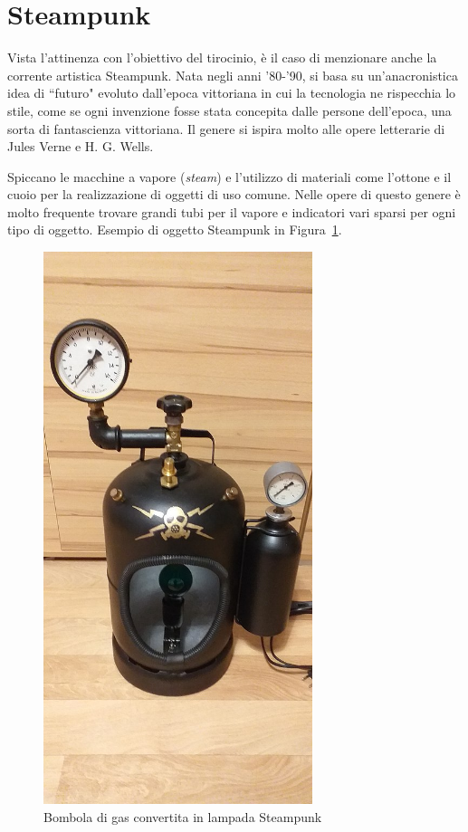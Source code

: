 \documentclass[12pt,a4paper]{report}
\begin{document}
\section{Steampunk}
Vista l'attinenza con l'obiettivo del tirocinio, è il caso di menzionare anche la corrente artistica Steampunk.
Nata negli anni '80-'90, si basa su un'anacronistica idea di ``futuro" evoluto dall'epoca vittoriana in cui la tecnologia ne rispecchia lo stile,
come se ogni invenzione fosse stata concepita dalle persone dell'epoca, una sorta di fantascienza vittoriana.
Il genere si ispira molto alle opere letterarie di Jules Verne e H. G. Wells.

Spiccano le macchine a vapore (\emph{steam}) e l'utilizzo di materiali come l'ottone e il cuoio per la realizzazione di oggetti di uso comune. \cite{focussteampunk}
Nelle opere di questo genere è molto frequente trovare grandi tubi per il vapore e indicatori vari sparsi per ogni tipo di oggetto.
Esempio di oggetto Steampunk in Figura~\ref{fig:steampunklamp}.

\begin{figure}[h]
  \centering
  \includegraphics[width=0.7\textwidth]{steampunklamp}
  \caption{Bombola di gas convertita in lampada Steampunk \cite{wiki:steampunklamp}}
  \label{fig:steampunklamp}
\end{figure}
\end{document}
